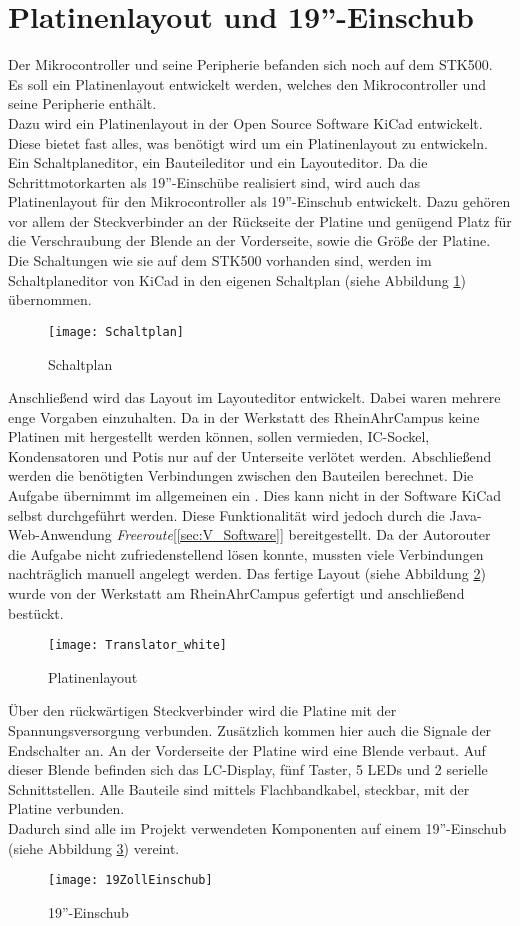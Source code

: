\section{Platinenlayout und 19''-Einschub}
\label{sec:Platinenlayout}
Der Mikrocontroller und seine Peripherie befanden sich noch auf dem STK500. Es soll ein Platinenlayout entwickelt werden, welches den Mikrocontroller und seine Peripherie enthält.\\
Dazu wird ein Platinenlayout in der Open Source Software KiCad entwickelt. Diese bietet fast alles, was benötigt wird um ein Platinenlayout zu entwickeln. Ein Schaltplaneditor, ein Bauteileditor und ein Layouteditor. Da die Schrittmotorkarten als 19''-Einschübe realisiert sind, wird auch das Platinenlayout für den Mikrocontroller als 19''-Einschub entwickelt. Dazu gehören vor allem der Steckverbinder an der Rückseite der Platine und genügend Platz für die Verschraubung der Blende an der Vorderseite, sowie die Größe der Platine. Die Schaltungen wie sie auf dem STK500 vorhanden sind, werden im Schaltplaneditor von KiCad in den eigenen Schaltplan (siehe Abbildung \ref{fig:Schaltplan}) übernommen.  
\begin{figure}[h]
\centering
\texttt{[image: Schaltplan]}
\caption{Schaltplan}
\label{fig:Schaltplan}
\end{figure}
Anschließend wird das Layout im Layouteditor entwickelt. Dabei waren mehrere enge Vorgaben einzuhalten. Da in der Werkstatt des RheinAhrCampus keine Platinen mit  hergestellt werden können, sollen  vermieden, IC-Sockel, Kondensatoren und Potis nur auf der Unterseite verlötet werden. Abschließend werden die benötigten Verbindungen zwischen den Bauteilen berechnet. Die Aufgabe übernimmt im allgemeinen ein . Dies kann nicht in der Software KiCad selbst durchgeführt werden. Diese Funktionalität wird jedoch durch die Java-Web-Anwendung \emph{Freeroute}[\ref{sec:V_Software}] bereitgestellt. Da der Autorouter die Aufgabe nicht zufriedenstellend lösen konnte, mussten viele Verbindungen nachträglich manuell angelegt werden. Das fertige Layout (siehe Abbildung \ref{fig:Platine}) wurde von der Werkstatt am RheinAhrCampus gefertigt und anschließend bestückt. 
\begin{figure}[h]
\centering
\texttt{[image: Translator\_white]}
\caption{Platinenlayout}
\label{fig:Platine}
\end{figure}
Über den rückwärtigen Steckverbinder wird die Platine mit der Spannungsversorgung verbunden. Zusätzlich kommen hier auch die Signale der Endschalter an. An der Vorderseite der Platine wird eine Blende verbaut. Auf dieser Blende befinden sich das LC-Display, fünf Taster, 5 LEDs und 2 serielle Schnittstellen. Alle Bauteile sind mittels Flachbandkabel, steckbar, mit der Platine verbunden.\\
Dadurch sind alle im Projekt verwendeten Komponenten auf einem 19''-Einschub (siehe Abbildung \ref{fig:Einschub}) vereint.
\begin{figure}[h]
\centering
\texttt{[image: 19ZollEinschub]}
\caption{19''-Einschub}
\label{fig:Einschub}
\end{figure}

